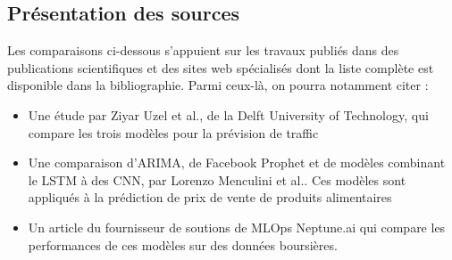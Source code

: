 \documentclass[french]{article}
\begin{document}
    \subsection{Présentation des sources}

    Les comparaisons ci-dessous s'appuient sur les travaux publiés dans des publications scientifiques et des sites web spécialisés dont la liste complète est disponible dans la bibliographie. Parmi ceux-là, on pourra notamment citer :
    \begin{itemize}
        \item Une étude par Ziyar Uzel et al., de la Delft University of Technology\cite{uzel}, qui compare les trois modèles pour la prévision de traffic 
        \item Une comparaison d'ARIMA, de Facebook Prophet et de modèles combinant le LSTM à des CNN, par Lorenzo Menculini et al.\cite{menculini}. Ces modèles sont appliqués à la prédiction de prix de vente de produits alimentaires
        \item Un article du fournisseur de soutions de MLOps Neptune.ai\cite{neptune} qui compare les performances de ces modèles sur des données boursières.
    \end{itemize}
\end{document}

